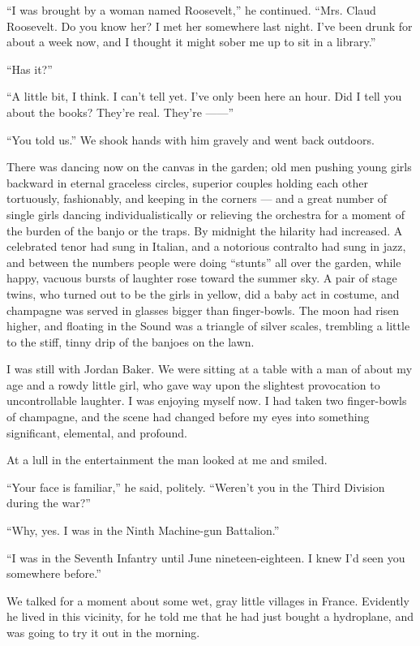 \documentclass{znotebook}
\begin{document}
``I was brought by a woman named Roosevelt,'' he continued. ``Mrs. Claud Roosevelt. Do you know her? I met her somewhere last night. I've been drunk for about a week now, and I thought it might sober me up to sit in a library.''

``Has it?''

``A little bit, I think. I can't tell yet. I've only been here an hour. Did I tell you about the books? They're real. They're ——''

``You told us.'' We shook hands with him gravely and went back outdoors.

There was dancing now on the canvas in the garden; old men pushing young girls backward in eternal graceless circles, superior couples holding each other tortuously, fashionably, and keeping in the corners — and a great number of single girls dancing individualistically or relieving the orchestra for a moment of the burden of the banjo or the traps. By midnight the hilarity had increased. A celebrated tenor had sung in Italian, and a notorious contralto had sung in jazz, and between the numbers people were doing ``stunts'' all over the garden, while happy, vacuous bursts of laughter rose toward the summer sky. A pair of stage twins, who turned out to be the girls in yellow, did a baby act in costume, and champagne was served in glasses bigger than finger-bowls. The moon had risen higher, and floating in the Sound was a triangle of silver scales, trembling a little to the stiff, tinny drip of the banjoes on the lawn.

I was still with Jordan Baker. We were sitting at a table with a man of about my age and a rowdy little girl, who gave way upon the slightest provocation to uncontrollable laughter. I was enjoying myself now. I had taken two finger-bowls of champagne, and the scene had changed before my eyes into something significant, elemental, and profound.

At a lull in the entertainment the man looked at me and smiled.

``Your face is familiar,'' he said, politely. ``Weren't you in the Third Division during the war?''

``Why, yes. I was in the Ninth Machine-gun Battalion.''

``I was in the Seventh Infantry until June nineteen-eighteen. I knew I'd seen you somewhere before.''

We talked for a moment about some wet, gray little villages in France. Evidently he lived in this vicinity, for he told me that he had just bought a hydroplane, and was going to try it out in the morning.
\end{document}
